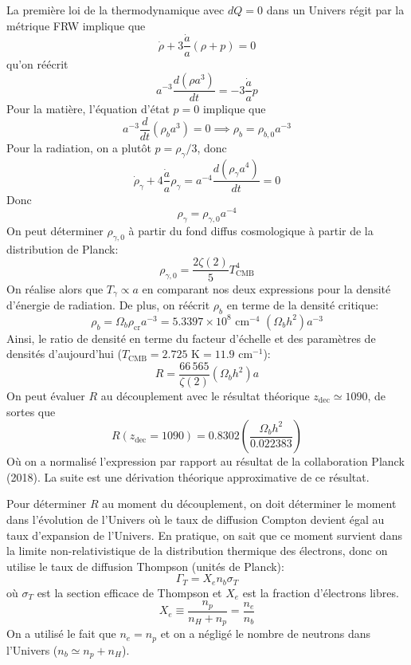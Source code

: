 \documentclass{article}
\numberwithin{equation}{section}
\begin{document}
La première loi de la thermodynamique avec $dQ=0$ 
dans un Univers régit par la métrique FRW 
implique que
\[
        \dot{\rho} + 3\frac{\dot{a}}{a} (\rho + p) = 0
\]
qu'on réécrit
\[
        a^{-3}\frac{d(\rho a^3)}{dt} = -3\frac{\dot{a}}{a}p
\]
Pour la matière, l'équation d'état $p = 0$ implique que
\[
        a^{-3}\frac{d}{dt}(\rho_b a^3) = 0 \implies \rho_b = \rho_{b,0}a^{-3}
\]
Pour la radiation, on a plutôt $p = \rho_\gamma / 3$, donc
\[
        \dot{\rho}_\gamma + 4\frac{\dot{a}}{a} \rho_\gamma 
        = a^{-4} \frac{d(\rho_\gamma a^4)}{dt} = 0
\]
Donc
\[
        \rho_\gamma = \rho_{\gamma, 0} a^{-4}
\]
On peut déterminer $\rho_{\gamma, 0}$ à partir du 
fond diffus cosmologique à partir de la distribution de Planck:
\[
        \rho_{\gamma, 0} = \frac{2\zeta(2)}{5}T^4_{\text{CMB}}
\]
On réalise alors que $T_\gamma \propto a$ en comparant nos deux 
expressions pour la densité d'énergie de radiation. 
De plus, on réécrit $\rho_b$ en terme de la densité critique:
\[
        \rho_{b} = \Omega_b \rho_{\text{cr}}a^{-3} 
        = 5.3397\times 10^{8}\,\,\text{cm}^{-4}\,\,(\Omega_b h^2)a^{-3}
\]
Ainsi, le ratio de densité en terme du facteur d'échelle et 
des paramètres de densités d'aujourd'hui 
({$T_{\text{CMB}} = 2.725\,\,\text{K} = 11.9\,\,\text{cm}^{-1}$}):
\[
        \boxed{R =  
        \frac{66\,565}{\zeta(2)} (\Omega_bh^2) a}
\]
On peut évaluer $R$ au découplement avec le résultat théorique
$z_{\text{dec}} \simeq 1090$, de sortes que
\[
        \boxed{R(z_{\text{dec}} = 1090) = 0.8302 \left( \frac{\Omega_b h^2}{0.022383} \right)}
\]
Où on a normalisé l'expression par rapport au résultat de la collaboration Planck (2018).
La suite est une dérivation théorique approximative de ce résultat.

Pour déterminer $R$ au moment du découplement, on doit déterminer 
le moment dans l'évolution de l'Univers où le taux de diffusion Compton 
devient égal au taux d'expansion de l'Univers. En pratique, on sait que 
ce moment survient dans la limite non-relativistique de la distribution thermique
des électrons, donc on utilise le taux de diffusion Thompson (unités de Planck):
\[
       \Gamma_{T} = X_e n_b \sigma_T
\]
où $\sigma_T$ est la section efficace de Thompson et $X_e$ est la 
fraction d'électrons libres.
\[
        X_e \equiv \frac{n_p}{n_H + n_p} = \frac{n_e}{n_b}
\]
On a 
utilisé le fait que $n_e = n_p$ et on a
négligé le nombre de neutrons dans l'Univers ($n_b \simeq n_p + n_H$).
\end{document}
